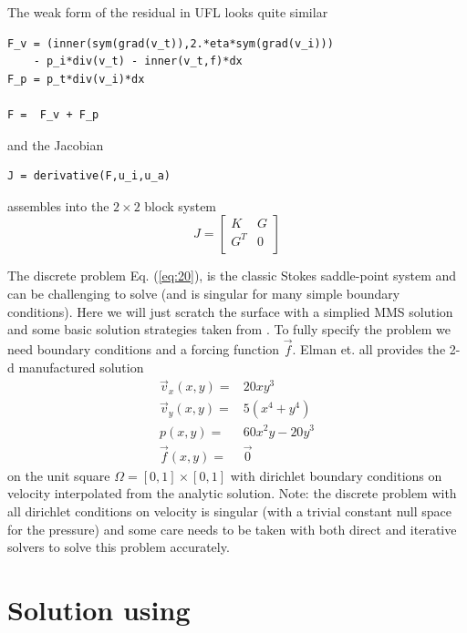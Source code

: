 The weak form of the residual in UFL looks quite similar
\begin{lstlisting}[style=UFL]
F_v = (inner(sym(grad(v_t)),2.*eta*sym(grad(v_i)))
    - p_i*div(v_t) - inner(v_t,f)*dx  
F_p = p_t*div(v_i)*dx 

F =  F_v + F_p 
\end{lstlisting}
and the Jacobian
\begin{lstlisting}[style=UFL]
  J = derivative(F,u_i,u_a)
\end{lstlisting}
assembles into the $2\times2$ block system
\begin{equation}
  \label{eq:20}
  J =
  \left[
    \begin{array}{cc}
      K & G \\
      G^{T} & 0\\
    \end{array}
  \right]
\end{equation}

The discrete problem Eq. (\ref{eq:20}),  is the classic Stokes
saddle-point system and can be challenging to solve (and is singular
for many simple boundary conditions).  Here we will just scratch the
surface with a simplied MMS solution and some basic solution
strategies taken from \cite{elman_finite_2005}.  To fully specify the problem we need boundary conditions and a
forcing function $\vec{f}$. Elman et. all \cite{elman_finite_2005} provides  the
2-d manufactured solution 
\begin{align}
  \vec{v}_{x}(x,y) =& 20xy^{3} \nonumber \\
  \vec{v}_{y}(x,y) =& 5(x^{4} + y^{4})  \\
   p(x,y) =& 60x^{2}y - 20y^{3} \nonumber \\
   \vec{f}(x,y) =& \vec{0} \nonumber 
\end{align}
on the unit square $\Omega=[0,1]\times[0,1]$ with dirichlet boundary conditions on velocity interpolated from the
analytic solution.  Note: the discrete problem with all dirichlet
conditions on velocity is singular (with a trivial constant null space
for the pressure) and some care needs to be taken with both direct and
iterative solvers to solve this problem accurately.

\section{Solution using \TF}
\label{sec:solution-using-tf}

